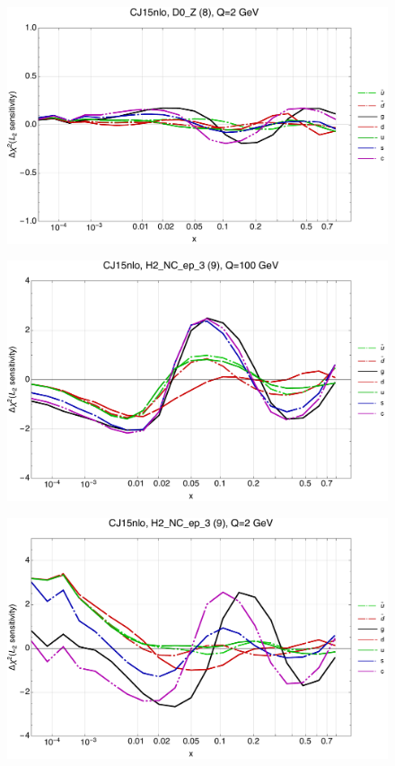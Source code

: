 \documentclass[10pt,aps,prd,floatfix,titlepage]{revtex4}
\begin{document}
\begin{figure}
\includegraphics[width=\textwidth,height=0.44\textheight,keepaspectratio]{1/8_CJ15nlo_L2_q2_Sf_1.pdf}
\caption{}
\end{figure}
\clearpage
\begin{figure}
\includegraphics[width=\textwidth,height=0.44\textheight,keepaspectratio]{1/9_CJ15nlo_L2_q100_Sf_1.pdf}
\caption{}
\end{figure}
\begin{figure}
\includegraphics[width=\textwidth,height=0.44\textheight,keepaspectratio]{1/9_CJ15nlo_L2_q2_Sf_1.pdf}
\caption{}
\end{figure}
\end{document}
